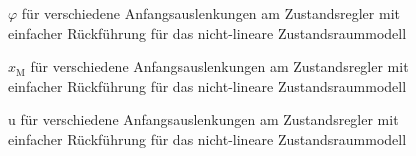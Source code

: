 \begin{figure}[H]
    \centering
    \caption[$\varphi$ für Regler mit einfacher Rückführung (nicht-linear)]{$\varphi$ für verschiedene Anfangsauslenkungen am Zustandsregler mit einfacher Rückführung für das nicht-lineare Zustandsraummodell}
    \label{fig:Bild29}
\end{figure}

\begin{figure}[H]
    \centering
    \caption[$x_{\mathrm{M}}$ für Regler mit einfacher Rückführung (nicht-linear)]{$x_{\mathrm{M}}$ für verschiedene Anfangsauslenkungen am Zustandsregler mit einfacher Rückführung für das nicht-lineare Zustandsraummodell}
    \label{fig:Bild30}
\end{figure}

\begin{figure}[H]
    \centering
    \caption[u für Regler mit einfacher Rückführung (nicht-linear)]{u für verschiedene Anfangsauslenkungen am Zustandsregler mit einfacher Rückführung für das nicht-lineare Zustandsraummodell}
    \label{fig:Bild31}
\end{figure}


